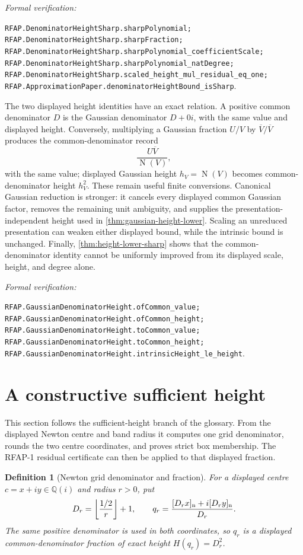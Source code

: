 \documentclass[11pt]{article}
\newtheorem{definition}[definition]{Definition}
\newcommand{\Qi}{\mathbb{Q}(i)}
\newcommand{\Norm}[1]{\operatorname{N}\!\left(#1\right)}
\newcommand{\leanref}[1]{\par\smallskip\noindent
  \emph{Formal verification:}\par\nobreak
  {\raggedright\nolinkurl{#1}.\par}}
\begin{document}
\leanref{RFAP.DenominatorHeightSharp.sharpPolynomial;
RFAP.DenominatorHeightSharp.sharpFraction;
RFAP.DenominatorHeightSharp.sharpPolynomial_coefficientScale;
RFAP.DenominatorHeightSharp.sharpPolynomial_natDegree;
RFAP.DenominatorHeightSharp.scaled_height_mul_residual_eq_one;
RFAP.ApproximationPaper.denominatorHeightBound_isSharp}

The two displayed height identities have an exact relation.  A positive
common denominator $D$ is the Gaussian denominator $D+0i$, with the same
value and displayed height.  Conversely, multiplying a Gaussian fraction
$U/V$ by $\overline V/\overline V$ produces the common-denominator record
\[
                    \frac{U\overline V}{\Norm V},
\]
with the same value; displayed Gaussian height $h_V=\Norm V$ becomes
common-denominator height $h_V^2$.  These remain useful finite conversions.
Canonical Gaussian reduction is stronger: it cancels every displayed common
Gaussian factor, removes the remaining unit ambiguity, and supplies the
presentation-independent height used in
\cref{thm:gaussian-height-lower}.  Scaling an unreduced presentation can
weaken either displayed bound, while the intrinsic bound is unchanged.
Finally, \cref{thm:height-lower-sharp} shows that the common-denominator
identity cannot be uniformly improved from its displayed scale, height, and
degree alone.

\leanref{RFAP.GaussianDenominatorHeight.ofCommon_value;
RFAP.GaussianDenominatorHeight.ofCommon_height;
RFAP.GaussianDenominatorHeight.toCommon_value;
RFAP.GaussianDenominatorHeight.toCommon_height;
RFAP.GaussianDenominatorHeight.intrinsicHeight_le_height}

\section{A constructive sufficient height}
\label{sec:upper}

This section follows the sufficient-height branch of the glossary.  From the
displayed Newton centre and band radius it computes one grid denominator,
rounds the two centre coordinates, and proves strict box membership.  The
RFAP-1 residual certificate can then be applied to that displayed fraction.

\begin{definition}[Newton grid denominator and fraction]
\label{def:newton-grid}
For a displayed centre $c=x+iy\in\Qi$ and radius $r>0$, put
\[
 D_r=\left\lfloor\frac{1/2}{r}\right\rfloor+1,
 \qquad
 q_r=\frac{[D_rx]_{\rm n}+i[D_ry]_{\rm n}}{D_r}.
\]
The same positive denominator is used in both coordinates, so $q_r$ is a
displayed common-denominator fraction of exact height $H(q_r)=D_r^2$.
\end{definition}
\end{document}
